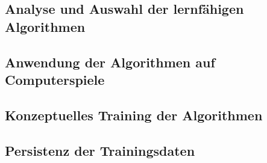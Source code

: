 \subsection{Analyse und Auswahl der lernfähigen Algorithmen}

\subsection{Anwendung der Algorithmen auf Computerspiele}

\subsection{Konzeptuelles Training der Algorithmen}

\subsection{Persistenz der Trainingsdaten}